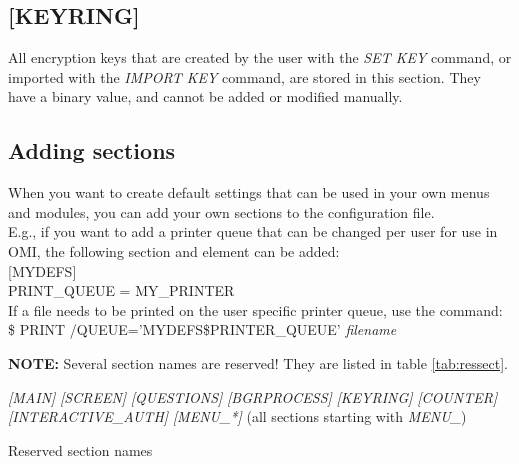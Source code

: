 \documentclass[a4paper]{book}
\newcommand{\vs}{\vspace{3mm}}
\renewcommand{\indent}{\hspace*{5mm}}
\begin{document}
\subsection{[KEYRING]}
\label{subsubsec:mylabel20}

All encryption keys that are created by the user with the \textsl{SET KEY} command, 
or imported with the \textsl{IMPORT KEY} command, are stored in this section. They 
have a binary value, and cannot be added or modified manually.

\subsection{Adding sections}
\label{subsubsec:adding}

When you want to create default settings that can be used in your own menus 
and modules, you can add your own sections to the configuration file. \\
E.g., if you want to add a printer queue that can be changed per user for 
use in OMI, the following section and element can be added: \\
\indent\textsf{[MYDEFS]} \\
\indent\indent\textsf{PRINT{\_}QUEUE = MY{\_}PRINTER} \\
If a file needs to be printed on the user specific printer queue, use the command: \\
\indent\textsf{{\$} PRINT /QUEUE='MYDEFS{\$}PRINTER{\_}QUEUE' \textit{filename}}

\vs

\hspace{-8mm}\textbf{NOTE:} Several section names are reserved! They are listed in table 
\ref{tab:ressect}.

\begin{table}[ht]
\begin{minipage}[t]{\textwidth}
\noindent\textsl{[MAIN]} \newline
\textsl{[SCREEN]} \newline
\textsl{[QUESTIONS]} \newline
\textsl{[BGRPROCESS]} \newline
\textsl{[KEYRING]} \newline
\textsl{[COUNTER]} \newline
\textsl{[INTERACTIVE{\_}AUTH]} \newline
\textsl{[MENU{\_}\textit{*}]} (all sections starting with \textsl{MENU{\_}}) \newline
\caption{Reserved section names}\label{tab:ressect}
\end{minipage}
\end{table}
\end{document}
